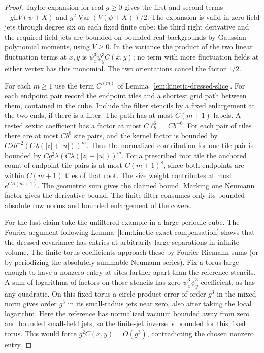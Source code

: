 \documentclass[11pt]{article}
\theoremstyle{definition}
\newcommand{\E}{\mathbb E}
\newcommand{\Var}{\operatorname{Var}}
\begin{document}
\begin{proof}
Taylor expansion for real \(g\ge0\) gives the first and second
terms \(-g\E V(\psi+X)\) and
\(g^2\Var(V(\psi+X))/2\). The expansion is valid in
zero-field jets through degree six on each fixed finite
cube: the third right derivative and the required field
jets are bounded on bounded real backgrounds by Gaussian
polynomial moments, using \(V\ge0\). In the variance the
product of the two linear fluctuation terms at \(x,y\) is
\(\psi_x^3\psi_y^3\widetilde C(x,y)\); no term with more
fluctuation fields at either vertex has this monomial.
The two orientations cancel the factor \(1/2\).

For each \(m\ge1\) use the term \(C^{(m)}\) of
Lemma~\ref{lem:kinetic-dressed-slice}. For each endpoint
pair record the endpoint tiles and a shortest grid path
between them, contained in the cube. Include the filter
stencils by a fixed enlargement at the two ends, if
there is a filter. The path has at most \(C(m+1)\) labels.
A tested sextic coefficient has a factor at most
\(C\ell_b^6=C b^{-6}\). For each pair of tiles there are
at most \(C b^8\) site pairs, and the kernel factor
is bounded by \(C\lambda b^{-2}(C\lambda (|z|+|u|))^m\).
Thus the normalized contribution for one tile pair
is bounded by
\(C g^2\lambda(C\lambda(|z|+|u|))^m\).
For a prescribed root tile the anchored count of
endpoint tile pairs is at most \(C(m+1)^8\), since
both endpoints are within \(C(m+1)\) tiles of that root.
The size weight contributes at most \(e^{C A(m+1)}\).
The geometric sum gives the claimed bound. Marking one
Neumann factor gives the derivative bound. The finite
filter consumes only its bounded absolute row norms and
bounded enlargement of the covers.

For the last claim take the unfiltered example in a
large periodic cube. The Fourier argument following
Lemma~\ref{lem:kinetic-exact-compensation} shows
that the dressed covariance has entries at arbitrarily
large separations in infinite volume. The finite torus
coefficients approach these by Fourier Riemann sums
(or by periodizing the absolutely summable Neumann series).
Fix a torus large enough to have a nonzero entry at sites
farther apart than the reference stencils. A sum of
logarithms of factors on those stencils has zero
\(\psi_x^3\psi_y^3\) coefficient, as has any quadratic.
On this fixed torus a circle-product error of order
\(g^3\) in the mixed norm gives order \(g^3\) in its
small-radius jets near zero, also after taking the local
logarithm. Here the reference has normalized vacuum
bounded away from zero and bounded small-field jets,
so the finite-jet inverse is bounded for this fixed torus.
This would force
\(g^2\widetilde C(x,y)=O(g^3)\), contradicting the
chosen nonzero entry.
\end{proof}
\end{document}

